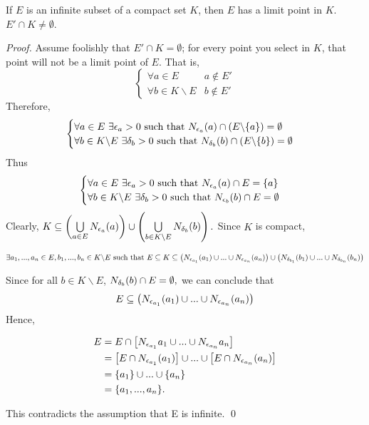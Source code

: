 	\begin{theorem}
		If $E$ is an infinite subset of a compact set $K$, then $E$ has a limit point in $K$. $E'\cap K \not = \emptyset$.
	\end{theorem}
	
	\begin{proof}
		Assume foolishly that $E'\cap K = \emptyset$; for every point you select in $K$, that point will not be a limit point of $E$. That is,
		$$
		\begin{cases}
			\forall a \in E &a\not \in E' \\
			\forall b \in K \backslash E &b\not \in E'
		\end{cases}
		$$
		Therefore,
		$$
		\begin{cases}
			\forall a \in E ~\exists \epsilon_a > 0 \text{ such that } N_{\epsilon_a}(a)\cap (E \backslash \{a\})=\emptyset \\
			\forall b \in K \backslash E ~\exists \delta_b > 0 \text{ such that } N_{\delta_b}(b)\cap (E \backslash \{b\})=\emptyset \\
		\end{cases}
		$$
		Thus
		$$
		\begin{cases}
			\forall a \in E ~\exists \epsilon_a > 0 \text{ such that } N_{\epsilon_a}(a)\cap E = \{a\} \\
			\forall b \in K \backslash E ~\exists \delta_b > 0 \text{ such that } N_{\epsilon_b}(b)\cap E = \emptyset
		\end{cases}
		$$
		Clearly, $K \subseteq \left( \bigcup \limits_{a\in E} N_{\epsilon_a}(a)
		\right) \cup \left( \bigcup \limits_{b\in K\backslash E} N_{\delta_b}(b)\right).$ Since $K$ is compact,
		
		$$\exists a_1,...,a_n \in E, b_1,...,b_n \in K \backslash E \text{ such that } \\ E \subseteq K \subseteq \left(N_{\epsilon_{a_1}}(a_1)\cup...\cup N_{\epsilon_{a_n}}(a_n)\right)\cup \left(N_{\delta_{b_1}}(b_1)\cup...\cup N_{\delta_{b_n}}(b_n)\right) $$
		
		Since for all $b\in K \backslash E$, $N_{\delta_b}(b)\cap E = \emptyset,$ we can conclude that
		$$E \subseteq \left( N_{\epsilon_{a_1}}(a_1) \cup...\cup N_{\epsilon_{a_n}}(a_n) \right)$$
		Hence, 
		
		\begin{align*}
			E &= E \cap \left[ N_{\epsilon_{a_1}}a_1 \cup ... \cup N_{\epsilon_{a_n}}a_n \right] \\
				&= \left[E\cap N_{\epsilon_{a_1}}(a_1) \right] \cup ... \cup \left[ E \cap N_{\epsilon_{a_n}}(a_n)\right] \\
				&= \{a_1\} \cup ... \cup \{a_n\} \\
				&= \{a_1,...,a_n\}.
		\end{align*}
		
		This contradicts the assumption that E is infinite. \qed
	\end{proof}
	
